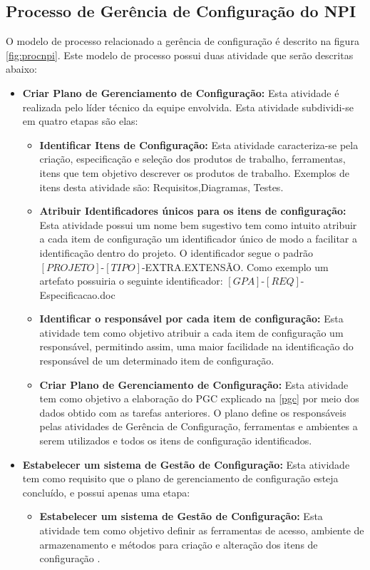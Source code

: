 \subsection{Processo de Gerência de Configuração do NPI}
O modelo de processo relacionado a gerência de configuração é descrito na figura \autoref{fig:procnpi}. Este modelo de processo possui duas atividade que serão descritas abaixo:
\begin{itemize}
\item \textbf{Criar Plano de Gerenciamento de Configuração:} Esta atividade é realizada pelo líder técnico da equipe envolvida. Esta atividade subdividi-se em quatro etapas são elas:
\begin{itemize}
\item \textbf{Identificar Itens de Configuração:} Esta atividade caracteriza-se pela criação, especificação e seleção dos produtos de trabalho, ferramentas, itens que tem objetivo descrever os produtos de trabalho. Exemplos de itens desta atividade são: Requisitos,Diagramas, Testes.

\item \textbf{Atribuir Identificadores únicos para os itens de configuração:} Esta atividade possui um nome bem sugestivo tem como intuito atribuir a cada item de configuração um identificador único de modo a facilitar a identificação dentro do projeto. O identificador segue o padrão $\left[PROJETO\right]$-$\left[TIPO\right]$-EXTRA.EXTENSÃO. Como exemplo um artefato possuiria o seguinte identificador: $\left[GPA\right]$-$\left[REQ\right]$-Especificacao.doc

\item \textbf{Identificar o responsável por cada item de configuração:} Esta atividade tem como objetivo atribuir a cada item de configuração um responsável, permitindo assim, uma maior facilidade na identificação do responsável de um determinado item de configuração.
\item \textbf{Criar	Plano de Gerenciamento de Configuração:} Esta atividade tem como objetivo a elaboração do PGC explicado na \autoref{pgc} por meio dos dados obtido com as tarefas anteriores. O plano define os responsáveis pelas atividades de Gerência de Configuração, ferramentas e ambientes a serem utilizados e todos os itens de configuração identificados.
\end{itemize}
\item \textbf{Estabelecer um sistema de Gestão de Configuração:} Esta atividade tem como requisito que o plano de gerenciamento de configuração esteja concluído, e possui apenas uma etapa:
\begin{itemize}
\item \textbf{Estabelecer um sistema de Gestão de Configuração:} Esta atividade tem como objetivo definir as ferramentas de acesso, ambiente de armazenamento e métodos para criação e alteração dos itens de configuração \cite{processonpi}. 
\end{itemize}
\end{itemize}

